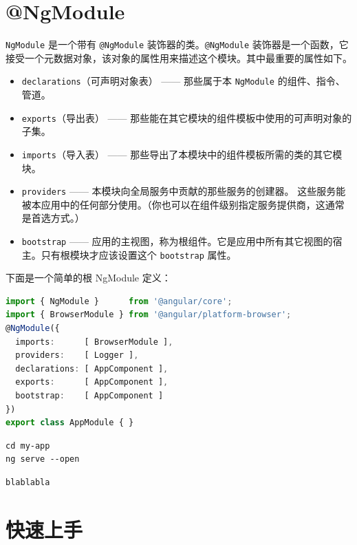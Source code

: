 \documentclass{../utils/progartcn}
\begin{document}
\section{\ttfamily @NgModule }

\verb|NgModule| 是一个带有 \verb|@NgModule| 装饰器的类。\verb|@NgModule| 装饰器是一个函数，它接受一个元数据对象，该对象的属性用来描述这个模块。其中最重要的属性如下。

\begin{itemize}
  \item \verb|declarations|（可声明对象表） —— 那些属于本 \verb|NgModule| 的组件、指令、管道。
  
  \item \verb|exports|（导出表） —— 那些能在其它模块的组件模板中使用的可声明对象的子集。
  
  \item \verb|imports|（导入表） —— 那些导出了本模块中的组件模板所需的类的其它模块。
  
  \item \verb|providers| —— 本模块向全局服务中贡献的那些服务的创建器。 这些服务能被本应用中的任何部分使用。（你也可以在组件级别指定服务提供商，这通常是首选方式。）
  
  \item \verb|bootstrap| —— 应用的主视图，称为根组件。它是应用中所有其它视图的宿主。只有根模块才应该设置这个 \verb|bootstrap| 属性。
\end{itemize}


下面是一个简单的根 NgModule 定义：

\begin{lstlisting}[language=TypeScript,caption={src/app/app.module.ts}]
import { NgModule }      from '@angular/core';
import { BrowserModule } from '@angular/platform-browser';
@NgModule({
  imports:      [ BrowserModule ],
  providers:    [ Logger ],
  declarations: [ AppComponent ],
  exports:      [ AppComponent ],
  bootstrap:    [ AppComponent ]
})
export class AppModule { }
\end{lstlisting}

\begin{lstlisting}[style=bashstyle]
cd my-app
ng serve --open
\end{lstlisting}

\begin{lstlisting}[style=bashoutputstyle]
blablabla
\end{lstlisting}

\section{快速上手}
\end{document}
